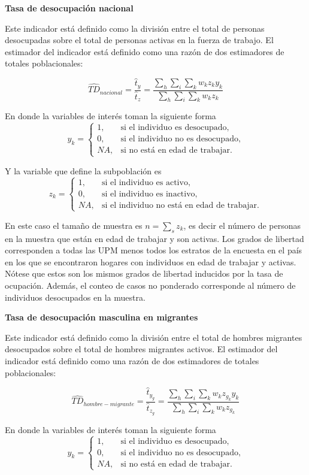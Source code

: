 \documentclass[
  12pt,
  spanish,
]{book}
\begin{document}
\textbf{Tasa de desocupación nacional}

Este indicador está definido como la división entre el total de personas desocupadas sobre el total de personas activas en la fuerza de trabajo. El estimador del indicador está definido como una razón de dos estimadores de totales poblacionales:

\[
\widehat{TD}_{nacional} =  \frac{\hat t_y}{\hat t_z} =\frac{\sum_h\sum_i\sum_k w_kz_{k}y_{k}}{\sum_h\sum_i\sum_k w_kz_{k}}
\]

En donde la variables de interés toman la siguiente forma
\[
y_{k}=
\begin{cases}
1, &\text{si el individuo es desocupado,}\\
0, &\text{si el individuo no es desocupado,}\\
NA, &\text{si no está en edad de trabajar.}
\end{cases}
\]

Y la variable que define la subpoblación es
\[
z_{k}=
\begin{cases}
1, &\text{si el individuo es activo,}\\
0, &\text{si el individuo es inactivo,}\\
NA, &\text{si el individuo no está en edad de trabajar.}
\end{cases}
\]

En este caso el tamaño de muestra es \(n = \sum_s z_{k}\), es decir el número de personas en la muestra que están en edad de trabajar y son activas. Los grados de libertad corresponden a todas las UPM menos todos los estratos de la encuesta en el país en los que se encontraron hogares con individuos en edad de trabajar y activas. Nótese que estos son los mismos grados de libertad inducidos por la tasa de ocupación. Además, el conteo de casos no ponderado corresponde al número de individuos desocupados en la muestra.

\textbf{Tasa de desocupación masculina en migrantes}

Este indicador está definido como la división entre el total de hombres migrantes desocupados sobre el total de hombres migrantes activos. El estimador del indicador está definido como una razón de dos estimadores de totales poblacionales:

\[
\widehat{TD}_{hombre-migrante} =  \frac{\hat t_{y_g}}{\hat t_{z_g}} =\frac{\sum_h\sum_i\sum_k w_kz_{g_k}y_{k}}{\sum_h\sum_i\sum_k w_kz_{g_k}}
\]

En donde la variables de interés toman la siguiente forma
\[
y_{k}=
\begin{cases}
1, &\text{si el individuo es desocupado,}\\
0, &\text{si el individuo no es desocupado,}\\
NA, &\text{si no está en edad de trabajar.}
\end{cases}
\]
\end{document}
